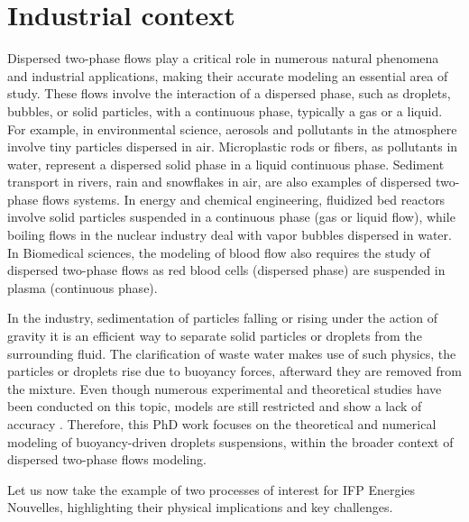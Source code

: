 \section{Industrial context}

Dispersed two-phase flows play a critical role in numerous natural phenomena and industrial applications, making their accurate modeling an essential area of study.
These flows involve the interaction of a dispersed phase, such as droplets, bubbles, or solid particles, with a continuous phase, typically a gas or a liquid. 
For example, in environmental science, aerosols and pollutants in the atmosphere involve tiny particles dispersed in air. 
Microplastic rods or fibers, as pollutants in water, represent a dispersed solid phase in a liquid continuous phase. 
Sediment transport in rivers, rain and snowflakes in air, are also examples of dispersed two-phase flows systems. 
In energy and chemical engineering, fluidized bed reactors involve solid particles suspended in a continuous phase (gas or liquid flow),  while boiling flows in the nuclear industry deal with vapor bubbles dispersed in water. 
In Biomedical sciences, the modeling of blood flow also requires the study of dispersed two-phase flows as red blood cells (dispersed phase) are suspended in plasma (continuous phase). 

In the industry, sedimentation of particles falling or rising under the action of gravity it is an efficient way to separate solid particles or droplets from the surrounding fluid. 
The clarification of waste water makes use of such physics, the particles or droplets rise due to buoyancy forces, afterward they are removed from the mixture.
Even though numerous experimental and theoretical studies have been conducted on this topic, models are still restricted and show a lack of accuracy \citet{paisant2014modelisation}. 
Therefore, this PhD work focuses on the theoretical and numerical modeling of buoyancy-driven droplets suspensions,  within the broader context of dispersed two-phase flows modeling.  

Let us now take the example of two processes of interest for IFP Energies Nouvelles, highlighting their physical implications and key challenges.  


